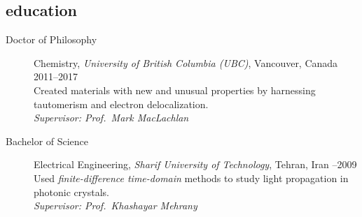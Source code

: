 \documentclass[overlapped,line,10pt,a4paper]{res}
\begin{document}
\begin{resume}
\section{education}
\begin{description}
\item [Doctor of Philosophy] Chemistry, \emph{University of British Columbia (UBC)}, Vancouver, Canada \hspace{\fill} 2011–2017 \\
{\small Created materials with new and unusual properties by harnessing tautomerism and electron delocalization.\\ \emph{Supervisor: Prof.\ Mark MacLachlan}}
\item [Bachelor of Science] Electrical Engineering, \emph{Sharif University of Technology}, Tehran, Iran \hspace{}–2009 \\
{\small Used \emph{finite-difference time-domain} methods to study light propagation in photonic crystals.\\ \emph{Supervisor: Prof.\ Khashayar Mehrany}}
\end{description}


\end{resume}
\end{document}
